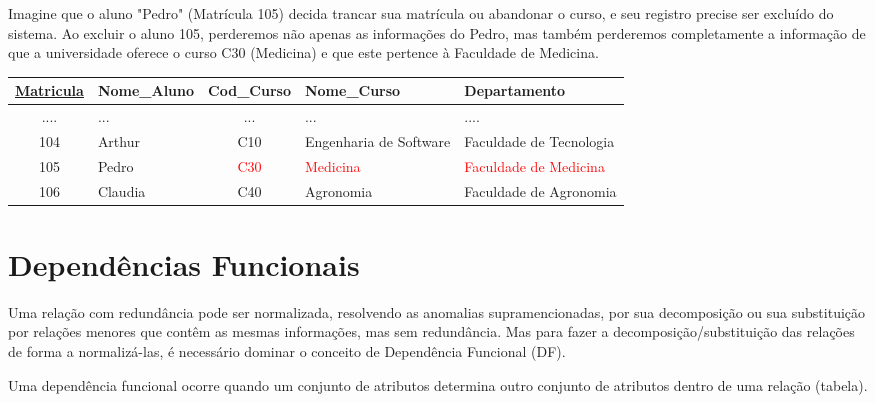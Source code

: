 \begin{tcolorbox}[breakable, colback=blue!5,colframe=blue!40!black,title=Situação exemplo]
    Imagine que o aluno "Pedro" (Matrícula 105) decida trancar sua matrícula ou abandonar o curso, e seu registro precise ser excluído do sistema. Ao excluir o aluno 105, perderemos não apenas as informações do Pedro, mas também perderemos completamente a informação de que a universidade oferece o curso C30 (Medicina) e que este pertence à Faculdade de Medicina.

    \vspace{0.5cm}

    \centering
    \renewcommand{\arraystretch}{1.2}

    \begin{adjustbox}{max width=\textwidth}
    \begin{tabular}{|c|l|c|l|l|}
    \hline
    \textbf{\underline{Matricula}} & \textbf{Nome\_Aluno} & \textbf{Cod\_Curso} & \textbf{Nome\_Curso} & \textbf{Departamento} \\ \hline
    .... & ... & ... & ... & .... \\ \hline
    104 & Arthur & C10 & Engenharia de Software & Faculdade de Tecnologia \\ \hline
    105 & Pedro & \textcolor{red}{C30} & \textcolor{red}{Medicina} & \textcolor{red}{Faculdade de Medicina} \\ \hline
    106 & Claudia & C40 & Agronomia & Faculdade de Agronomia \\ \hline
    \end{tabular}
\end{adjustbox}    
    \label{tab:anomaliaex_exemplo}
\end{tcolorbox}

\section{Dependências Funcionais}
Uma relação com redundância pode ser normalizada, resolvendo as anomalias supramencionadas, por sua decomposição ou sua substituição por relações menores que contêm as mesmas informações, mas sem redundância.\cite{ramakrishnan2011} Mas para fazer a decomposição/substituição das relações de forma a normalizá-las, é necessário dominar o conceito de Dependência Funcional (DF). 

Uma dependência funcional ocorre quando um conjunto de atributos determina outro conjunto de atributos dentro de uma relação (tabela). 

